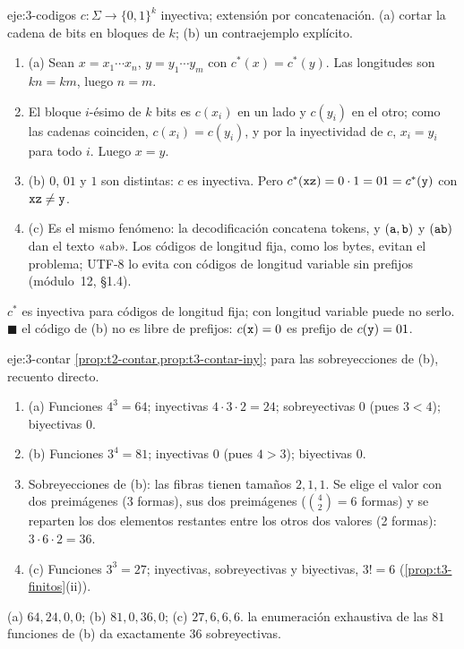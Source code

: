 \begin{solucion}{eje:3-codigos}
\datos $c\colon\Sigma\to\{0,1\}^{k}$ inyectiva; extensión por concatenación.
\planteamiento (a) cortar la cadena de bits en bloques de $k$; (b) un contraejemplo explícito.
\pasos
\begin{enumerate}[label=\arabic*.]
  \item (a) Sean $x=x_1\cdots x_n$, $y=y_1\cdots y_m$ con $c^{*}(x)=c^{*}(y)$. Las longitudes son $kn=km$, luego $n=m$.
  \item El bloque $i$-ésimo de $k$ bits es $c(x_i)$ en un lado y $c(y_i)$ en el otro; como las cadenas coinciden, $c(x_i)=c(y_i)$, y por la inyectividad de $c$, $x_i=y_i$ para todo $i$. Luego $x=y$.
  \item (b) $0$, $01$ y $1$ son distintas: $c$ es inyectiva. Pero $c^{*}(\texttt{xz})=0\cdot1=01=c^{*}(\texttt{y})$ con $\texttt{xz}\neq\texttt{y}$.
  \item (c) Es el mismo fenómeno: la decodificación concatena tokens, y $(\texttt{a},\texttt{b})$ y $(\texttt{ab})$ dan el texto «ab». Los códigos de longitud fija, como los bytes, evitan el problema; UTF-8 lo evita con códigos de longitud variable sin prefijos (módulo~12, §1.4).
\end{enumerate}
\resultado $c^{*}$ es inyectiva para códigos de longitud fija; con longitud variable puede no serlo. \hfill$\blacksquare$
\comprobacion el código de (b) no es libre de prefijos: $c(\texttt{x})=0$ es prefijo de $c(\texttt{y})=01$.
\end{solucion}

\begin{solucion}{eje:3-contar}
\planteamiento \cref{prop:t2-contar,prop:t3-contar-iny}; para las sobreyecciones de (b), recuento directo.
\pasos
\begin{enumerate}[label=\arabic*.]
  \item (a) Funciones $4^{3}=64$; inyectivas $4\cdot3\cdot2=24$; sobreyectivas $0$ (pues $3<4$); biyectivas $0$.
  \item (b) Funciones $3^{4}=81$; inyectivas $0$ (pues $4>3$); biyectivas $0$.
  \item Sobreyecciones de (b): las fibras tienen tamaños $2,1,1$. Se elige el valor con dos preimágenes (3 formas), sus dos preimágenes ($\binom42=6$ formas) y se reparten los dos elementos restantes entre los otros dos valores (2 formas): $3\cdot6\cdot2=36$.
  \item (c) Funciones $3^{3}=27$; inyectivas, sobreyectivas y biyectivas, $3!=6$ (\cref{prop:t3-finitos}(ii)).
\end{enumerate}
\resultado (a) $64,24,0,0$; (b) $81,0,36,0$; (c) $27,6,6,6$.
\comprobacion la enumeración exhaustiva de las $81$ funciones de (b) da exactamente $36$ sobreyectivas.
\end{solucion}

